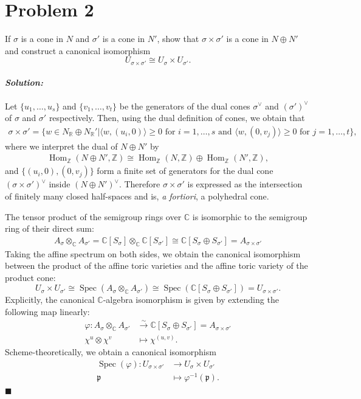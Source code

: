 \documentclass[12pt, a4paper]{article}
\newenvironment{solution}
  {\paragraph{\textit{Solution:}}\par\medskip}
  {\hfill$\blacksquare$\vspace{0.1cm}}
\begin{document}
\section*{Problem 2}
If $\sigma$ is a cone in $N$ and $\sigma'$ is a cone in $N'$, show that $\sigma \times \sigma'$ is a cone in $N \oplus N'$ and construct a canonical isomorphism
\[
U_{\sigma \times \sigma'} \cong U_{\sigma} \times U_{\sigma'}.
\]
\begin{solution}
Let $\{u_1,\dots,u_s\}$ and $\{v_1,\dots,v_t\}$ be the generators of the dual cones $\sigma^\vee$ and $(\sigma')^\vee$ of $\sigma$ and $\sigma'$ respectively.
Then, using the dual definition of cones, we obtain that
\begin{align*}
    \sigma \times \sigma' = \{w\in N_\mathbb{R}\oplus N_\mathbb{R}'|\langle w,(u_i,0)\rangle\ge 0\text{ for $i=1,\dots,s$}\text{ and }\langle w,(0,v_j)\rangle\ge 0\text{ for $j=1,\dots,t$}\},
\end{align*}
where we interpret the dual of $N\oplus N'$ by
\begin{align*}
    \operatorname{Hom}_{\mathbb{Z}}(N\oplus N',\mathbb{Z}) \cong \operatorname{Hom}_{\mathbb{Z}}(N,\mathbb{Z}) \oplus \operatorname{Hom}_{\mathbb{Z}}(N',\mathbb{Z}),
\end{align*}
and $\{(u_i, 0), (0, v_j)\}$ form a finite set of generators for the dual cone $(\sigma \times \sigma')^\vee$ inside $(N \oplus N')^\vee$. 
Therefore $\sigma \times \sigma'$ is expressed as the intersection of finitely many closed half-spaces and is, \textit{a fortiori}, a polyhedral cone.

The tensor product of the semigroup rings over $\mathbb{C}$ is isomorphic to the semigroup ring of their direct sum:
\begin{align*}
    A_\sigma \otimes_{\mathbb{C}} A_{\sigma'} = \mathbb{C}[S_\sigma] \otimes_{\mathbb{C}} \mathbb{C}[S_{\sigma'}] \cong \mathbb{C}[S_\sigma \oplus S_{\sigma'}] = A_{\sigma \times \sigma'}
\end{align*}
Taking the affine spectrum on both sides, we obtain the canonical isomorphism between the product of the affine toric varieties and the affine toric variety of the product cone:
$$U_\sigma \times U_{\sigma'} \cong \operatorname{Spec}(A_\sigma \otimes_{\mathbb{C}} A_{\sigma'}) \cong \operatorname{Spec}(\mathbb{C}[S_\sigma \oplus S_{\sigma'}]) = U_{\sigma \times \sigma'}.$$
Explicitly, the canonical $\mathbb{C}$-algebra isomorphism is given by extending the following map linearly:
\begin{align*}
    \varphi: A_\sigma \otimes_{\mathbb{C}} A_{\sigma'} &\xrightarrow{\sim} \mathbb{C}[S_\sigma \oplus S_{\sigma'}] = A_{\sigma \times \sigma'} \\
    \chi^u \otimes \chi^v &\mapsto \chi^{(u, v)}.
\end{align*}
Scheme-theoretically, we obtain a canonical isomorphism 
\begin{align*}
    \operatorname{Spec}(\varphi): U_{\sigma\times\sigma'} &\to U_{\sigma} \times U_{\sigma'} \\
    \mathfrak{p} &\mapsto \varphi^{-1}(\mathfrak{p}).
\end{align*}
\end{solution}
\end{document}
